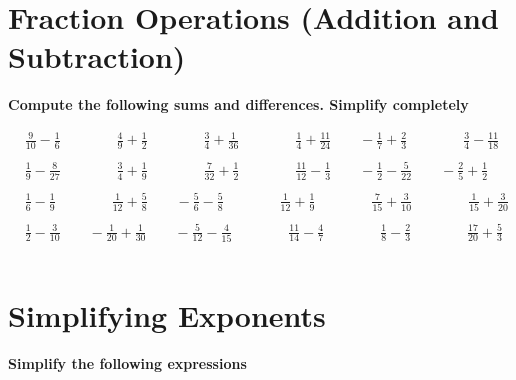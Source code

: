 \documentclass{article}
\begin{document}
\bigskip

\section{Fraction Operations (Addition and Subtraction)}
\textbf{Compute the following sums and differences. Simplify completely}
\bigskip

\(\begin{aligned}
	&\frac{9}{10}-\frac{1}{6}\qquad \qquad \frac{4}{9}+\frac{1}{2} \qquad\qquad \frac{3}{4}+\frac{1}{36} \qquad\qquad \frac{1}{4}+\frac{11}{24} \qquad -\frac{1}{7}+\frac{2}{3} \qquad\qquad \frac{3}{4}-\frac{11}{18} \\\\
	&\frac{1}{9}-\frac{8}{27}\qquad \qquad \frac{3}{4}+\frac{1}{9} \qquad\qquad \frac{7}{32}+\frac{1}{2} \qquad\qquad \frac{11}{12}-\frac{1}{3} \qquad -\frac{1}{2}-\frac{5}{22} \qquad -\frac{2}{5}+\frac{1}{2} \\\\
	&\frac{1}{6}-\frac{1}{9} \qquad\qquad \frac{1}{12}+\frac{5}{8} \qquad -\frac{5}{6}-\frac{5}{8} \qquad\qquad \frac{1}{12}+\frac{1}{9} \qquad\qquad \frac{7}{15}+\frac{3}{10} \qquad\qquad \frac{1}{15}+\frac{3}{20} \\\\
	&\frac{1}{2}-\frac{3}{10} \qquad -\frac{1}{20}+\frac{1}{30} \qquad -\frac{5}{12}-\frac{4}{15} \qquad\qquad \frac{11}{14} -\frac{4}{7} \qquad\qquad \frac{1}{8}-\frac{2}{3} \qquad\qquad \frac{17}{20}+\frac{5}{3} \\\\
\end{aligned}\)



\section{Simplifying Exponents}
\textbf{Simplify the following expressions}
\bigskip
\end{document}
